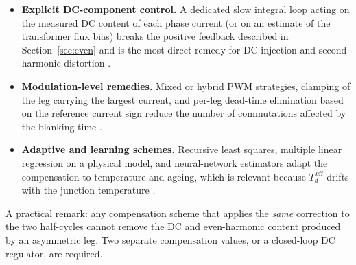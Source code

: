 \documentclass[11pt,a4paper]{article}
\begin{document}
\begin{itemize}
synchronous reference frames, repetitive control and iterative learning control suppress
whatever periodic distortion is present, provided the loop bandwidth is sufficient. For
even harmonics the resonant terms must be placed at $2\omega$ and $4\omega$ --- in the
synchronous frame at $\omega$ and $3\omega$ --- which is often forgotten when only the
$6k$ terms are addressed \cite{teodorescu2006,zhou2003,lascu2007,yepes2011}.
\item \textbf{Explicit DC-component control.} A dedicated slow integral loop acting on the
measured DC content of each phase current (or on an estimate of the transformer flux bias)
breaks the positive feedback described in Section~\ref{sec:even} and is the most direct
remedy for DC injection and second-harmonic distortion
\cite{buticchi2011,buticchi2013,armstrong2006}.
\item \textbf{Modulation-level remedies.} Mixed or hybrid PWM strategies, clamping of the
leg carrying the largest current, and per-leg dead-time elimination based on the reference
current sign reduce the number of commutations affected by the blanking time
\cite{wang2011,chen2008}.
\item \textbf{Adaptive and learning schemes.} Recursive least squares, multiple linear
regression on a physical model, and neural-network estimators adapt the compensation to
temperature and ageing, which is relevant because $T_{d}^{\,\mathrm{eff}}$ drifts with the
junction temperature \cite{urasaki2005,bedetti2015,herran2013}.
\end{itemize}

A practical remark: any compensation scheme that applies the \emph{same} correction to the
two half-cycles cannot remove the DC and even-harmonic content produced by an asymmetric
leg. Two separate compensation values, or a closed-loop DC regulator, are required.
\end{document}
